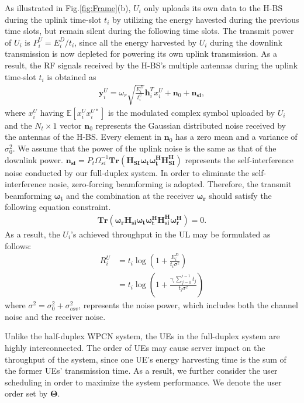 \documentclass[12pt,draftcls,onecolumn,journal]{IEEEtran}
\begin{document}

As illustrated in Fig.\ref{fig:Frame}(b), $U_i$ only uploads its own data to the H-BS during the uplink time-slot $t_{i}$ by utilizing the energy havested during the previous time slots, but remain silent during the following time slots. The transmit power of $U_i$ is $P_i^{U} = E_{i}^D / t_{i}$, since all the energy harvested by $U_i$ during the downlink transmission is now depleted for powering its own uplink transmission. As a result, the RF signals received by the H-BS's multiple antennas during the uplink time-slot $t_i$ is obtained as
\begin{align}
\mathbf{y}_{i}^U = \omega_r\sqrt{\frac{E_{i}^D}{t_{i}^U}}\mathbf{h}_i^Tx_i^U + \mathbf{n}_0 + \mathbf{n_{si}},
\end{align}
where $x_i^U$ having $\mathbb{E}[x_i^Ux_i^{U*}]$ is the modulated complex symbol uploaded by $U_i$ and the $N_t\times 1$ vector $\mathbf{n}_0$ represents the Gaussian distributed noise received by the antennas of the H-BS. Every element in $\mathbf{n}_0$ has a zero mean and a variance of $\sigma_0^2$. We assume that the power of the uplink noise is the same as that of the downlink power. $\mathbf{n_{si}} = P_t\Omega_{si}^{-1}\mathbf{Tr(H_{SI}\omega_t\omega_t^HH_{SI}^H)}$ represents the self-interference noise conducted by our full-duplex system. In order to eliminate the self-interference nosie, zero-forcing beamforming is adopted. Therefore, the transmit beamforming $\mathbf{\omega_t}$ and the combination at the receiver $\mathbf{\omega_r}$ should satisfy the following equation constraint.
\begin{align}
\mathbf{Tr(\omega_rH_{si}\omega_t\omega_t^HH_{si}^H\omega_r^H)} = 0.
\end{align}
As a result, the $U_i$'s achieved throughput in the UL may be formulated as follows:
\begin{align}
R_i^U & = t_i\log(1 + \frac{E_i^D}{t_i\sigma^2}) \\
& = t_i\log(1 + \frac{\gamma_i\sum_{j=0}^{i-1}t_{j}}{t_i\sigma^2})
\end{align}
where $\sigma^2 = \sigma_0^2 + \sigma_{cov}^2$, represents the noise power, which includes both the channel noise and the receiver noise.

Unlike the half-duplex WPCN system, the UEs in the full-duplex system are highly interconnected. The order of UEs may cause server impact on the throughput of the system, since one UE's energy harvesting time is the sum of the former UEs' transmission time. As a result, we further consider the user scheduling in order to maximize the system performance. We denote the user order set by $\mathbf{\Theta}$.
\end{document}
